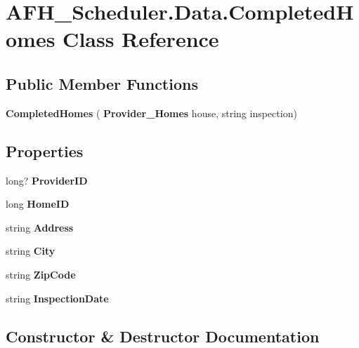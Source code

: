 \section{A\+F\+H\+\_\+\+Scheduler.\+Data.\+Completed\+Homes Class Reference}
\label{class_a_f_h___scheduler_1_1_data_1_1_completed_homes}
\subsection*{Public Member Functions}
\begin{DoxyCompactItemize}
\item 
\textbf{ Completed\+Homes} (\textbf{ Provider\+\_\+\+Homes} house, string inspection)
\end{DoxyCompactItemize}
\subsection*{Properties}
\begin{DoxyCompactItemize}
\item 
long? \textbf{ Provider\+ID}\hspace{0.3cm}{\ttfamily  [get, set]}
\item 
long \textbf{ Home\+ID}\hspace{0.3cm}{\ttfamily  [get, set]}
\item 
string \textbf{ Address}\hspace{0.3cm}{\ttfamily  [get, set]}
\item 
string \textbf{ City}\hspace{0.3cm}{\ttfamily  [get, set]}
\item 
string \textbf{ Zip\+Code}\hspace{0.3cm}{\ttfamily  [get, set]}
\item 
string \textbf{ Inspection\+Date}\hspace{0.3cm}{\ttfamily  [get, set]}
\end{DoxyCompactItemize}


\subsection{Constructor \& Destructor Documentation}
\mbox{\label{class_a_f_h___scheduler_1_1_data_1_1_completed_homes_a3927d41e28466b21570f24637ce03954}} 
